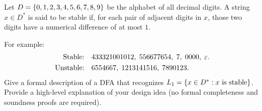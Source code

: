 \begin{problem}
  Let $D = \left\{0, 1, 2, 3, 4, 5, 6, 7, 8, 9 \right\}$
  be the alphabet of all decimal digits.
  A string $x \in D^*$ is said to be stable if,
  for each pair of adjacent digits in $x$,
  those two digits have a numerical difference of at most $1$.

  \step
  For example:
  \begin{align*}
    \text{Stable:} \quad & 433321001012,\; 556677654,\; 7,\;  0000,\; \varepsilon. \\
    \text{Unstable:} \quad & 6554667,\; 1213141516,\; 7890123.
  \end{align*}
  Give a formal description of a DFA that recognizes $L_1 = \left\{x \in D^* : x \text{ is stable}\right\}$.
  Provide a high-level explanation of your design idea
  (no formal completeness and soundness proofs are required).
\end{problem}
\begin{Answer}

\end{Answer}
